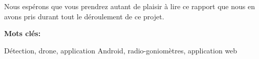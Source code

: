 Nous espérons que vous prendrez autant de plaisir à lire ce rapport que nous en avons pris durant tout le déroulement de ce projet. 


\vfill{}
\textbf{Mots clés:}

Détection, drone, application Android, radio-goniomètres, application web


